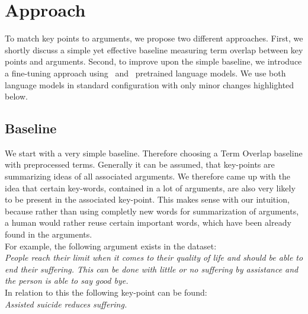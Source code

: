 \section{Approach}

To match key points to arguments, we propose two different approaches.
First, we shortly discuss a simple yet effective baseline measuring term overlap between key points and arguments.
Second, to improve upon the simple baseline, we introduce a fine-tuning approach using \Bert~\todocite and \Roberta~\todocite pretrained language models. We use both language models in standard configuration with only minor changes highlighted below.

\subsection{Baseline}

We start with a very simple baseline. Therefore choosing a Term Overlap baseline with preprocessed terms. 
Generally it can be assumed, that key-points are summarizing ideas of all associated arguments. We therefore came up with the idea
that certain key-words, contained in a lot of arguments, are also very likely to be present in the associated key-point. This makes 
sense with our intuition, because rather than using completly new words for summarization of arguments, a human would 
rather reuse certain important words, which have been already found in the arguments.\\
For example, the following argument exists in the \ArgKP dataset:\\
\textit{People reach their limit when it comes to 
their quality of life and should be able to end their {\color{blue} suffering}. This can be done with little 
or no {\color{blue} suffering} by {\color{orange} assistance} and the person is able to say good bye.}\\ 

In relation to this the following key-point can be found:\\
\textit{{\color{orange} Assisted} suicide reduces {\color{blue} suffering}.}\\

